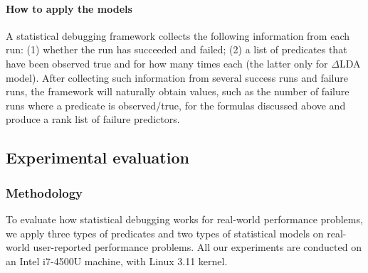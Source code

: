 \paragraph{How to apply the models}
A statistical debugging framework collects the following
information from each run: (1) whether the run has succeeded and failed;
(2) a list of predicates that have been observed true and for how many 
times each (the latter only for $\Delta$LDA model). 
After collecting such information from
several success runs and failure runs, the framework will naturally obtain
values, such as the number of failure runs where a predicate is observed/true,
for the formulas discussed above and produce a rank list of failure predictors.




\subsection{Experimental evaluation}
\label{sec:5_inhouse_results}
\subsubsection{Methodology}
\label{sec:5_inhouse_meth}
To evaluate how statistical debugging works for real-world performance problems,
we apply three types of predicates and two types of statistical models on 
real-world user-reported performance problems.
All our experiments are conducted on an Intel i7-4500U machine, with Linux 3.11 kernel.

